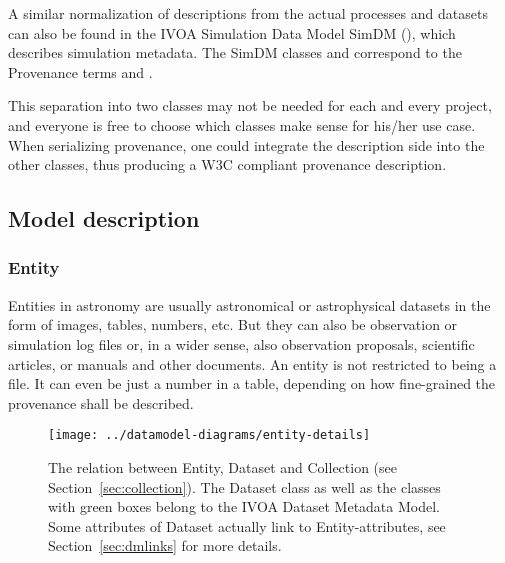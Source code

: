 A similar normalization of descriptions from the actual processes and datasets 
can also be found in the IVOA Simulation Data Model SimDM (\cite{std:SimDM}), 
which describes simulation metadata. The SimDM classes  and  
correspond to the Provenance terms  and .


This separation into two classes may not be needed for each and every project,
and everyone is free to choose which classes make sense for his/her use case.
When serializing provenance, one could integrate the description side into the 
other classes, thus producing a W3C compliant provenance description.



\subsection{Model description}
\subsubsection{Entity}
Entities in astronomy are usually astronomical or astrophysical datasets in the 
form of images, tables, numbers, etc. But they can also be observation or 
simulation log files or, in a wider sense, also observation proposals, scientific 
articles, or manuals and other documents. An entity is not restricted to being
a file. 
It can even be just a number in a table, depending on how fine-grained the 
provenance shall be described.

\begin{figure}[h]
\centering
\texttt{[image: ../datamodel-diagrams/entity-details]}
\caption{The relation between Entity, Dataset and Collection (see Section~\ref{sec:collection}). 
The Dataset class as well as the classes with green boxes belong to
the IVOA Dataset Metadata Model. Some attributes of Dataset actually link to Entity-attributes, 
see Section~\ref{sec:dmlinks} for more details.}
\label{fig:entity-details}
\end{figure}

